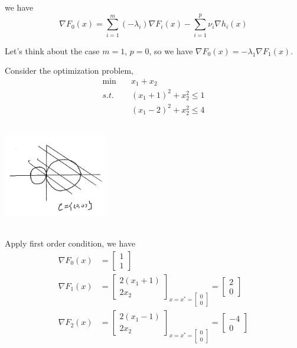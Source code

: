we have
$$\nabla F_0(x) = \sum^m_{i=1}(-\lambda_i)\nabla F_i(x) - \sum^p_{i=1}\nu_i\nabla h_i(x)$$

Let's think about the case $m=1$, $p=0$, so we have $\nabla F_0(x)=-\lambda_1\nabla F_1(x)$.

\begin{example}
Consider the optimization problem,
\begin{align*}
\min \quad & x_1+x_2\\
s.t. \quad & (x_1+1)^2 + x_2^2 \leq 1\\
&(x_1-2)^2 + x_2^2 \leq 4
\end{align*}

\begin{marginfigure}
	\centering
	\includegraphics[width=1.8in,height=1.8in]{figures/ch10/figure1204_5.png}
\end{marginfigure}

Apply first order condition, we have
\begin{align*}
\nabla F_0(x) &=\begin{bmatrix}
1\\
1
\end{bmatrix}\\
\nabla F_1(x) &=\begin{bmatrix}
2(x_1+1)\\
2x_2
\end{bmatrix}_{x=x^*=\begin{bmatrix}
	0\\
	0
	\end{bmatrix}}=\begin{bmatrix}
2\\
0
\end{bmatrix}\\
\nabla F_2(x) &=\begin{bmatrix}
2(x_1-1)\\
2x_2
\end{bmatrix}_{x=x^*=\begin{bmatrix}
	0\\
	0
	\end{bmatrix}}=\begin{bmatrix}
-4\\
0
\end{bmatrix}\\
\end{align*}


\end{example}



